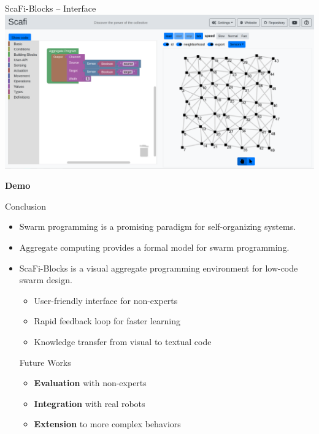 \documentclass[aspectratio=169]{beamer}
\begin{document}
\begin{frame}{ScaFi-Blocks -- Interface}
	\centering
	\includegraphics[width=\textwidth]{img/scafiblocks.png}
\end{frame}
\begin{frame}[standout]
	\Huge\textbf{Demo}
\end{frame}
\begin{frame}{Conclusion}
\begin{itemize}
	\item \alert{Swarm programming} is a promising paradigm for self-organizing systems.
	\item \alert{Aggregate computing} provides a formal model for swarm programming.
	\item \alert{ScaFi-Blocks} is a visual aggregate programming environment for low-code swarm design.
	\begin{itemize}
		\item \alert{User-friendly interface} for non-experts
		\item \alert{Rapid feedback loop} for faster learning
		\item \alert{Knowledge transfer} from visual to textual code
	\end{itemize}
	\begin{exampleblock}{Future Works}
		\begin{itemize}
		\item \textbf{Evaluation} with non-experts
		\item \textbf{Integration} with real robots
		\item \textbf{Extension} to more complex behaviors
		\end{itemize}
	\end{exampleblock}
\end{itemize}
\end{frame}
\end{document}
